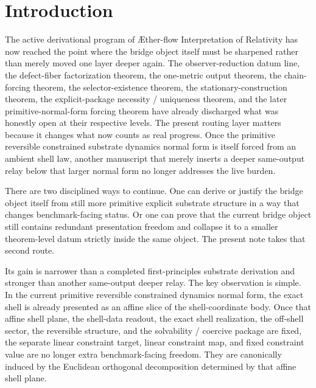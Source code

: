 \documentclass[11pt]{article}
\newcommand{\Aflow}{\AE{}ther-flow}
\newcommand{\TheoryName}{\Aflow{} Interpretation of Relativity}
\begin{document}
\section{Introduction}

The active derivational program of \TheoryName{} has now reached the point where the bridge object itself must be sharpened rather than merely moved one layer deeper again. The observer-reduction datum line, the defect-fiber factorization theorem, the one-metric output theorem, the chain-forcing theorem, the selector-existence theorem, the stationary-construction theorem, the explicit-package necessity / uniqueness theorem, and the later primitive-normal-form forcing theorem have already discharged what was honestly open at their respective levels. The present routing layer matters because it changes what now counts as real progress. Once the primitive reversible constrained substrate dynamics normal form is itself forced from an ambient shell law, another manuscript that merely inserts a deeper same-output relay below that larger normal form no longer addresses the live burden.

There are two disciplined ways to continue. One can derive or justify the bridge object itself from still more primitive explicit substrate structure in a way that changes benchmark-facing status. Or one can prove that the current bridge object still contains redundant presentation freedom and collapse it to a smaller theorem-level datum strictly inside the same object. The present note takes that second route.

Its gain is narrower than a completed first-principles substrate derivation and stronger than another same-output deeper relay. The key observation is simple. In the current primitive reversible constrained dynamics normal form, the exact shell is already presented as an affine slice of the shell-coordinate body. Once that affine shell plane, the shell-data readout, the exact shell realization, the off-shell sector, the reversible structure, and the solvability / coercive package are fixed, the separate linear constraint target, linear constraint map, and fixed constraint value are no longer extra benchmark-facing freedom. They are canonically induced by the Euclidean orthogonal decomposition determined by that affine shell plane.
\end{document}
